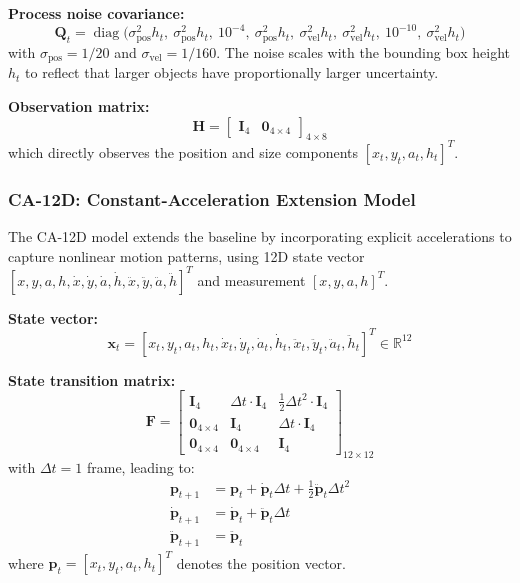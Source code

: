 \textbf{Process noise covariance:}
\begin{equation}
\mathbf{Q}_t = \operatorname{diag}\big(
   \sigma_{\text{pos}}^2 h_t,\ 
   \sigma_{\text{pos}}^2 h_t,\ 
   10^{-4},\ 
   \sigma_{\text{pos}}^2 h_t,\ 
   \sigma_{\text{vel}}^2 h_t,\ 
   \sigma_{\text{vel}}^2 h_t,\ 
   10^{-10},\ 
   \sigma_{\text{vel}}^2 h_t
\big)
\end{equation}
with $\sigma_{\text{pos}} = 1/20$ and $\sigma_{\text{vel}} = 1/160$. The noise scales with the bounding box height $h_t$ to reflect that larger objects have proportionally larger uncertainty.

\textbf{Observation matrix:}
\begin{equation}
\mathbf{H} = \begin{bmatrix}
\mathbf{I}_4 & \mathbf{0}_{4 \times 4}
\end{bmatrix}_{4 \times 8}
\end{equation}
which directly observes the position and size components $[x_t, y_t, a_t, h_t]^T$.

\subsubsection{CA-12D: Constant-Acceleration Extension Model}
The CA-12D model extends the baseline by incorporating explicit accelerations to capture nonlinear motion patterns, using 12D state vector $[x, y, a, h, \dot{x}, \dot{y}, \dot{a}, \dot{h}, \ddot{x}, \ddot{y}, \ddot{a}, \ddot{h}]^T$ and measurement $[x, y, a, h]^T$.

\textbf{State vector:}
\begin{equation}
\mathbf{x}_t = [x_t, y_t, a_t, h_t, \dot{x}_t, \dot{y}_t, \dot{a}_t, \dot{h}_t, \ddot{x}_t, \ddot{y}_t, \ddot{a}_t, \ddot{h}_t]^T \in \mathbb{R}^{12}
\end{equation}

\textbf{State transition matrix:}
\begin{equation}
\mathbf{F} = \begin{bmatrix}
\mathbf{I}_4 & \Delta t \cdot \mathbf{I}_4 & \tfrac{1}{2}\Delta t^2 \cdot \mathbf{I}_4 \\
\mathbf{0}_{4 \times 4} & \mathbf{I}_4 & \Delta t \cdot \mathbf{I}_4 \\
\mathbf{0}_{4 \times 4} & \mathbf{0}_{4 \times 4} & \mathbf{I}_4
\end{bmatrix}_{12 \times 12}
\end{equation}
with $\Delta t = 1$ frame, leading to:
\begin{align}
\mathbf{p}_{t+1} &= \mathbf{p}_t + \dot{\mathbf{p}}_t \Delta t + \tfrac{1}{2}\ddot{\mathbf{p}}_t \Delta t^2 \\
\dot{\mathbf{p}}_{t+1} &= \dot{\mathbf{p}}_t + \ddot{\mathbf{p}}_t \Delta t \\
\ddot{\mathbf{p}}_{t+1} &= \ddot{\mathbf{p}}_t
\end{align}
where $\mathbf{p}_t = [x_t, y_t, a_t, h_t]^T$ denotes the position vector.

